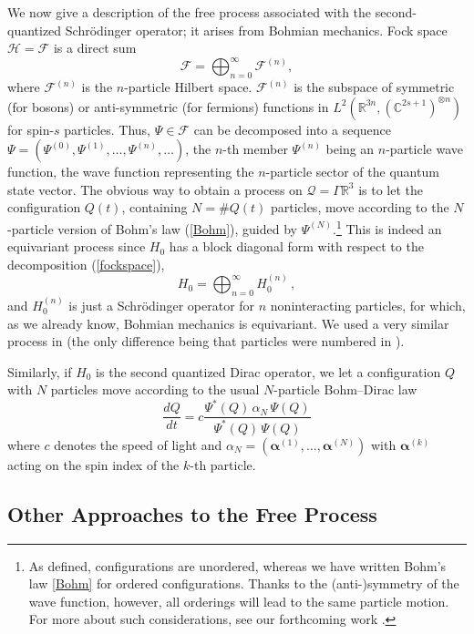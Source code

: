 \documentclass[12pt]{article}
\newcommand{\CCC}{\mathbb{C}} %
\newcommand{\RRR}{\mathbb{R}} %
\newcommand{\1}{\mathbf{1}} %
\newcommand{\Hilbert}{\mathscr{H}}
\newcommand{\Fock}{\mathscr{F}} %
\newcommand{\conf}{\mathcal{Q}} %
\newcommand{\valpha}{{\boldsymbol \alpha}}
\begin{document}
We now give a description of the free process associated with the
second-quantized Schr\"odinger operator; it arises from Bohmian
mechanics.  Fock space $\Hilbert = \Fock$ is a direct sum
\begin{equation}\label{fockspace}
   \Fock= \bigoplus_{n=0}^{\infty} \Fock^{(n)} ,
\end{equation}
where $\Fock^{(n)}$ is the $n$-particle Hilbert space.  $\Fock^{(n)}$
is the subspace of symmetric (for bosons) or anti-symmetric (for
fermions) functions in $L^2 (\RRR^{3n}, (\CCC^{2s+1})^{\otimes n})$
for spin-$s$ particles. Thus, $\Psi \in \Fock$ can be decomposed into
a sequence $\Psi = \left( \Psi^{(0)}, \Psi^{(1)}, \ldots, \Psi^{(n)},
\ldots \right)$, the $n$-th member $\Psi^{(n)}$ being an $n$-particle
wave function, the wave function representing the $n$-particle sector
of the quantum state vector.  The obvious way to obtain a process on
$\conf = \Gamma \RRR^3$ is to let the configuration $Q(t)$, containing
$N = \#Q(t)$ particles, move according to the $N$-particle version of
Bohm's law (\ref{Bohm}), guided by $\Psi^{(N)}$.\footnote{As defined,
configurations are unordered, whereas we have written Bohm's law
\eqref{Bohm} for ordered configurations.  Thanks to the
(anti\nobreakdash-)symmetry of the wave function, however, all
orderings will lead to the same particle motion. For more about such
considerations, see our forthcoming work \cite{identical}.}  This is
indeed an equivariant process since $H_0$ has a block diagonal form
with respect to the decomposition (\ref{fockspace}),
\[
   H_0 = \bigoplus_{n=0}^\infty H_0^{(n)}\,,
\]
and $H_0^{(n)}$ is just a Schr\"odinger operator for $n$
noninteracting particles, for which, as we already know, Bohmian
mechanics is equivariant.  We used a very similar process in
\cite{crea1} (the only difference being that particles were numbered
in \cite{crea1}).

Similarly, if $H_0$ is the second quantized Dirac operator, we let a
configuration $Q$ with $N$ particles move according to the usual
$N$-particle Bohm--Dirac law \cite[p.~274]{BH}
\begin{equation}\label{BohmDirac}
   \frac{dQ}{dt} = c\frac{\Psi^*(Q) \, \alpha_{N} \, \Psi(Q)}
   {\Psi^*(Q) \, \Psi(Q)}
\end{equation}
where $c$ denotes the speed of light and $\alpha_{N} = (\valpha^{(1)},
\ldots, \valpha^{(N)})$ with $\valpha^{(k)}$ acting on the spin index
of the $k$-th particle.



\subsection{Other Approaches to the Free Process}
\label{sec:free2}
\end{document}
